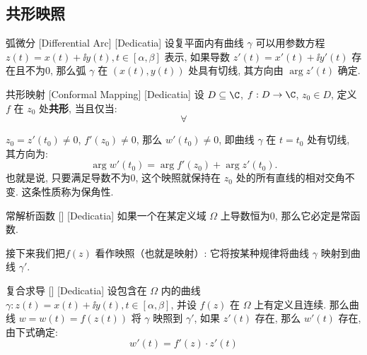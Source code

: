 \documentclass[UTF8]{ctexart}
\begin{document}

    \subsection{共形映照}

        \begin{dfn}
            [UUID]
            {弧微分}
            [Differential Arc]
            [Dedicatia]
            设复平面内有曲线 \(\gamma\) 可以用参数方程 \(z(t)=x(t)+\ii y(t), t\in[\alpha,\beta]\) 表示, 如果导数 \(z'(t)=x'(t)+\ii y'(t)\) 存在且不为0, 那么弧 \(\gamma\) 在 \((x(t),y(t))\) 处具有切线, 其方向由 \(\arg z'(t)\) 确定. 
        \end{dfn}

        \begin{dfn}
            {共形映射}
            [Conformal Mapping]
            [Dedicatia]
            设 \(D\subseteq\C\), \(f:D\to\C\), \(z_0\in D\), 定义 \(f\) 在 \(z_0\) 处\textbf{共形}, 当且仅当: 
            \[\forall \]
            
            \(z_0=z'(t_0)\neq 0\),  \(f'(z_0)\neq 0\), 那么 \(w'(t_0)\neq 0\), 即曲线 \(\gamma\) 在 \(t=t_0\) 处有切线, 其方向为: 
            \[\arg w'(t_0)=\arg f'(z_0)+\arg z'(t_0).\]
            也就是说, 只要满足导数不为0, 这个映照就保持在 \(z_0\) 处的所有直线的相对交角不变. 这条性质称为保角性. 
        \end{dfn}

        \begin{ppt}
            [TrivialAnalyticalFunction]
            {常解析函数}
            []
            [Dedicatia]
            如果一个 在某定义域 \(\Omega\) 上导数恒为0, 那么它必定是常函数. 
        \end{ppt}

        接下来我们把  \(f(z)\) 看作映照（也就是映射）: 它将按某种规律将曲线 \(\gamma\) 映射到曲线 \(\gamma'\). 

        \begin{thm}
            [UUID]
            {复合求导}
            []
            [Dedicatia]
            设包含在 \(\Omega\) 内的曲线 \(\gamma:z(t)=x(t)+\ii y(t), t\in[\alpha,\beta]\), 并设 \(f(z)\) 在 \(\Omega\) 上有定义且连续. 那么曲线 \(w=w(t)=f(z(t))\) 将 \(\gamma\) 映照到 \(\gamma'\), 如果 \(z'(t)\) 存在, 那么 \(w'(t)\) 存在, 由下式确定: 
            \[w'(t)=f'(z)\cdot z'(t)\]
        \end{thm}
\end{document}
